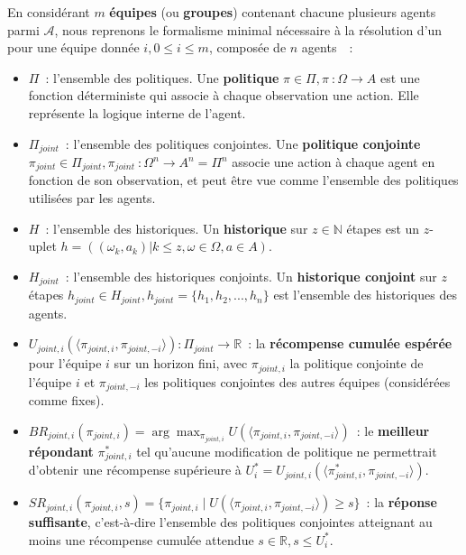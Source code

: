 En considérant $m$ \textbf{équipes} (ou \textbf{groupes}) contenant chacune plusieurs agents parmi $\mathcal{A}$, nous reprenons le formalisme minimal nécessaire à la résolution d'un  pour une équipe donnée $i, 0 \leq i \leq m$, composée de $n$ agents~\cite{Beynier2013,Albrecht2024}~:

\begin{itemize}
  \item $\Pi$~: l'ensemble des politiques. Une \textbf{politique} $\pi \in \Pi, \pi~: \Omega \rightarrow A$ est une fonction déterministe qui associe à chaque observation une action. Elle représente la logique interne de l'agent.
  \item $\Pi_{joint}$~: l'ensemble des politiques conjointes. Une \textbf{politique conjointe} $\pi_{joint} \in \Pi_{joint}, \pi_{joint}~: \Omega^n \rightarrow A^n = \Pi^n$ associe une action à chaque agent en fonction de son observation, et peut être vue comme l'ensemble des politiques utilisées par les agents.
  \item $H$~: l'ensemble des historiques. Un \textbf{historique} sur $z \in \mathbb{N}$ étapes est un $z$-uplet $h = ((\omega_k, a_k) | k \leq z, \omega \in \Omega, a \in A)$.
  \item $H_{joint}$~: l'ensemble des historiques conjoints. Un \textbf{historique conjoint} sur $z$ étapes $h_{joint} \in H_{joint}, h_{joint} = \{h_1, h_2, ..., h_n\}$ est l'ensemble des historiques des agents.
  \item $U_{joint,i}(\langle \pi_{joint,i}, \pi_{joint,-i} \rangle): \Pi_{joint} \rightarrow \mathbb{R}$~: la \textbf{récompense cumulée espérée} pour l'équipe $i$ sur un horizon fini, avec $\pi_{joint,i}$ la politique conjointe de l'équipe $i$ et $\pi_{joint,-i}$ les politiques conjointes des autres équipes (considérées comme fixes).
  \item $BR_{joint,i}(\pi_{joint,i}) = \arg\max_{\pi_{joint,i}} U(\langle \pi_{joint,i}, \pi_{joint,-i} \rangle)$~: le \textbf{meilleur répondant} $\pi^*_{joint,i}$ tel qu'aucune modification de politique ne permettrait d'obtenir une récompense supérieure à $U^*_i = U_{joint,i}(\langle \pi^*_{joint,i}, \pi_{joint,-i} \rangle)$.
  \item $SR_{joint,i}(\pi_{joint,i}, s) = \{\pi_{joint,i} \mid U(\langle \pi_{joint,i}, \pi_{joint,-i} \rangle) \geq s\}$~: la \textbf{réponse suffisante}, c'est-à-dire l'ensemble des politiques conjointes atteignant au moins une récompense cumulée attendue $s \in \mathbb{R}, s \leq U^*_i$.
\end{itemize}

